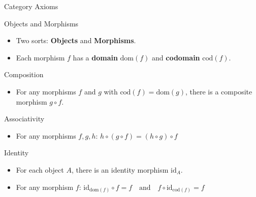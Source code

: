 \documentclass[ignorenonframetext,fleqn]{beamer}
\newcommand{\2}{\mathcal}
\begin{document}
\begin{frame}{Category Axioms}
    \begin{block}{Objects and Morphisms}
        \begin{itemize}
            \item Two sorts: \textbf{Objects} and \textbf{Morphisms}.
            \item Each morphism \( f \) has a \textbf{domain} \( \text{dom}(f) \) and \textbf{codomain} \( \text{cod}(f) \).
        \end{itemize}
    \end{block}
    \begin{block}{Composition}
        \begin{itemize}
            \item For any morphisms \( f \) and \( g \) with \( \text{cod}(f) = \text{dom}(g) \), there is a composite morphism \( g \circ f \).
        \end{itemize}
    \end{block}
    \begin{block}{Associativity}
        \begin{itemize}
            \item For any morphisms \( f, g, h \): $h \circ (g \circ f) = (h \circ g) \circ f$
        \end{itemize}
    \end{block}
    \begin{block}{Identity}
        \begin{itemize}
            \item For each object \( A \), there is an identity morphism \( \text{id}_A \).
            \item For any morphism \( f \): $\text{id}_{\text{dom}(f)}
              \circ f = f \quad \text{and} \quad f \circ
              \text{id}_{\text{cod}(f)} = f $
        \end{itemize}
    \end{block}
  \end{frame}
\end{document}
